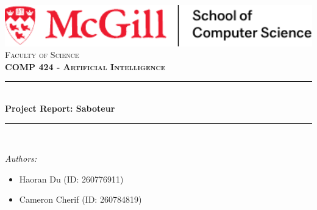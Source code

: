 \begin{titlepage}

\newcommand{\HRule}{\rule{\linewidth}{0.5mm}} %





\begin{center} %


\includegraphics[width = 16cm]{./figures/mcgill_socs.pdf}\\[1.0cm]
\textsc{\Large Faculty of Science}\\[1.5cm]
\textbf{\textsc{\LARGE COMP 424 - Artificial Intelligence}}\\[1.0cm]


\HRule \\[0.4cm]
{ \huge \bfseries Project Report: Saboteur}\\
\HRule \\[1.5cm]
\end{center}

\begin{flushleft} \large
\textit{Authors:}\\
\begin{itemize}
  \item Haoran Du (ID: 260776911)
  \item Cameron Cherif (ID: 260784819)
\end{itemize}
\end{flushleft}
\vspace{6.5cm}
\makeatletter
\begin{flushright} \large
\@date
\end{flushright}
\vfill %



\makeatother


\end{titlepage}
